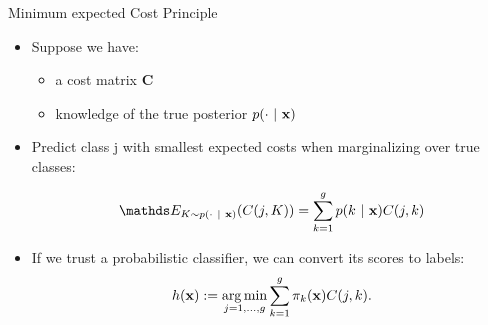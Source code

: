 \documentclass[11pt,compress,t,notes=noshow, xcolor=table]{beamer}
\begin{document}
\begin{frame}{Minimum expected Cost Principle}


		\begin{itemize}
		
			\item Suppose we have:
            \begin{itemize}
                \item a cost matrix $\mathbf{C}$
                
                \item knowledge of the true posterior $p(\cdot ~|~ \mathbf{x})$
            \end{itemize}

                

			\item Predict class j with smallest expected costs when marginalizing over true classes:
	
			$$ 	\E_{K \sim p(\cdot ~|~ \xv)}( C(j,K) ) = \sumkg p(k ~|~ \xv) C(j,k)	$$
	
		\end{itemize}

    \begin{itemize}
        \item If we trust a probabilistic classifier, we can convert its scores to labels:
		$$  h(\mathbf{x}) := \mathop{\mathrm{arg\,min}}\limits_{j=1,\ldots,g} \sum\limits_{k=1}^g 	\pi_{k}(\mathbf{x}) C(j,k). $$
 
        

\end{itemize}
\end{frame}
\end{document}
